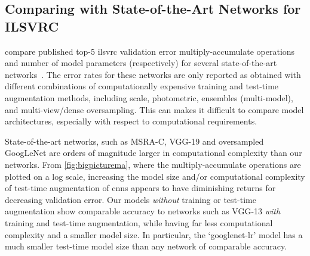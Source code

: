\documentclass[thesis]{subfiles}
\begin{document}
    \subsection{Comparing with State-of-the-Art Networks for ILSVRC}
     compare published top-5 \gls{ilsvrc} validation error \vs multiply-accumulate operations and number of model parameters (respectively) for several state-of-the-art networks~\citep{Simonyan2014verydeep,Szegedy2014going,He2015b}. The error rates for these networks are only reported as obtained with different combinations of computationally expensive training and test-time augmentation methods, including scale, photometric, ensembles (multi-model), and multi-view/dense oversampling. This can makes it difficult to compare model architectures, especially with respect to computational requirements.
    
    State-of-the-art networks, such as MSRA-C, VGG-19 and oversampled GoogLeNet are orders of magnitude larger in computational complexity than our networks. From \cref{fig:bigpicturema}, where the multiply-accumulate operations are plotted on a log scale, increasing the model size and/or computational complexity of test-time augmentation of \glspl{cnn} appears to have diminishing returns for decreasing validation error. Our models \emph{without} training or test-time augmentation show comparable accuracy to networks such as VGG-13 \emph{with} training and test-time augmentation, while having far less computational complexity and a smaller model size. In particular, the `googlenet-lr' model has a much smaller test-time model size than any network of comparable accuracy. 
    
\end{document}
